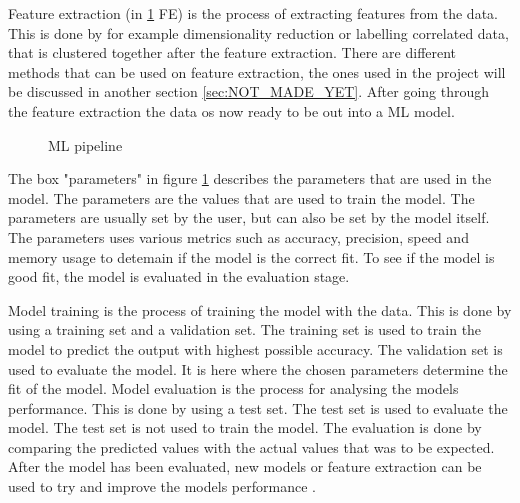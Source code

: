 Feature extraction (in \ref{fig:ml-pipeline} FE) is the process of extracting features from the data. This is done by for example dimensionality reduction or labelling correlated data, that is clustered together after the feature extraction. There are different methods that can be used on feature extraction, the ones used in the project will be discussed in another section \ref{sec:NOT_MADE_YET}. After going through the feature extraction the data os now ready to be out into a ML  model.
\begin{figure}
\centering
{}          
\caption{ML pipeline}
\label{fig:ml-pipeline}
\end{figure}

The box "parameters" in figure \ref{fig:ml-pipeline} describes the parameters that are used in the model. The parameters are the values that are used to train the model. The parameters are usually set by the user, but can also be set by the model itself. The parameters uses various metrics such as accuracy, precision, speed and memory usage to detemain if the model is the correct fit. To see if the model is good fit, the model is evaluated in the evaluation stage. 

Model training is the process of training the model with the data. This is done by using a training set and a validation set. The training set is used to train the model to predict the output with highest possible accuracy. The validation set is used to evaluate the model. It is here where the chosen parameters determine the fit of the model. 
Model evaluation is the process for analysing the models performance. This is done by using a test set. The test set is used to evaluate the model. The test set is not used to train the model. The evaluation is done by comparing the predicted values with the actual values that was to be expected. After the model has been evaluated, new models or feature extraction can be used to try and improve the models performance \cite{ml_pipeline_javapoint}.


\begin{comment}   
@misc{ml_pipeline_javapoint,
  organization = {javapoint},
  url          = {https://www.javatpoint.com/machine-learning-pipeline},
  title        = {Machine Learning Pipeline},
  urldate      = {2022-10-04}
}
\end{comment}